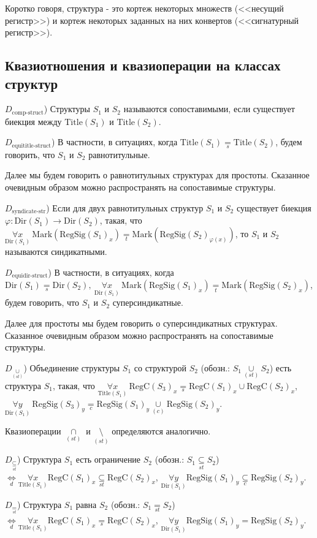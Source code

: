 \documentclass[a4paper]{article}
\newcommand{\Def}[0]{\underset{d}{\Leftrightarrow}}
\newcommand{\eqs}[0]{\underset{s}{=}} %
\newcommand{\eqt}[0]{\underset{t}{=}} %
\newcommand{\eqst}[0]{\underset{st}{=}} %
\newcommand{\subseteqst}[0]{\underset{st}{\subseteq}} %
\newcommand{\cupst}[0]{\underset{(st)}{\cup}}
\newcommand{\capst}[0]{\underset{(st)}{\cap}}
\newcommand{\setminusst}[0]{\underset{(st)}{\setminus}}
\newcommand{\eqc}[0]{\underset{c}{=}}
\newcommand{\cupc}[0]{\underset{(c)}{\cup}}
\newcommand{\subseteqc}[0]{\underset{c}{\subseteq}}
\newcommand{\Title}[1]{\mathrm{Title}(#1)}
\newcommand{\Dir}[1]{\mathrm{Dir}(#1)}
\newcommand{\RegSig}[1]{\mathrm{RegSig}(#1)}
\newcommand{\RegC}[1]{\mathrm{RegC}(#1)}
\newcommand{\Mark}[1]{\mathrm{Mark}(#1)}
\begin{document}
Коротко говоря, структура - это кортеж некоторых множеств (<<несущий регистр>>) и кортеж некоторых заданных на них конвертов (<<сигнатурный регистр>>).

\subsection{Квазиотношения и квазиоперации на классах структур}

$D_\text{comp-struct}$) Структуры $S_1$ и $S_2$ называются сопоставимыми, если существует биекция между $\Title{S_1}$ и $\Title{S_2}$.

$D_\text{equititle-struct}$) В частности, в ситуациях, когда $\Title{S_1} \eqs \Title{S_2}$, будем говорить, что $S_1$ и $S_2$ равнотитульные.

Далее мы будем говорить о равнотитульных структурах для простоты. Сказанное очевидным образом можно распространять на сопоставимые структуры.

$D_\text{syndicate-str}$) Если для двух равнотитульных структур $S_1$ и $S_2$ существует биекция $\varphi: \Dir{S_1} \rightarrow \Dir{S_2}$, такая, что $\underset{\Dir{S_1}}{\forall x}~ \Mark{\RegSig{S_1}_x} \eqt \Mark{\RegSig{S_2}_{\varphi(x)}}$, то $S_1$ и $S_2$ называются синдикатными.

$D_\text{equidir-struct}$) В частности, в ситуациях, когда $\Dir{S_1} \eqs \Dir{S_2},~ \underset{\Dir{S_1}}{\forall x}~ \Mark{\RegSig{S_1}_x} \eqt \Mark{\RegSig{S_2}_x}$, будем говорить, что $S_1$ и $S_2$ суперсиндикатные.

Далее для простоты мы будем говорить о суперсиндикатных структурах. Сказанное очевидным образом можно распространять на сопоставимые структуры.

$D_{\cupst}$) Объединение структуры $S_1$ со структурой $S_2$ (обозн.: $S_1 \cupst S_2$) есть структура $S_1$, такая, что $\underset{\Title{S_1}}{\forall x}~ \RegC{S_3}_x \eqs \RegC{S_1}_x \cup \RegC{S_2}_x$, $\underset{\Dir{S_1}}{\forall y}~ \RegSig{S_3}_y \eqc \RegSig{S_1}_y \cupc \RegSig{S_2}_y$.

Квазиоперации $\capst$ и $\setminusst$ определяются аналогично.

$D_{\subseteqst}$) Структура $S_1$ есть ограничение $S_2$ (обозн.: $S_1 \subseteqst S_2$) $\Def \underset{\Title{S_1}}{\forall x} \RegC{S_1}_x \subseteqst \RegC{S_2}_x$, $\underset{\Dir{S_1}}{\forall y} \RegSig{S_1}_y \subseteqc \RegSig{S_2}_y$. 

$D_{\eqst}$) Структура $S_1$ равна $S_2$ (обозн.: $S_1 \eqst S_2$) $\Def \underset{\Title{S_1}}{\forall x} \RegC{S_1}_x \eqs \RegC{S_2}_x$, $\underset{\Dir{S_1}}{\forall y} \RegSig{S_1}_y = \RegSig{S_2}_y$. 
\end{document}
